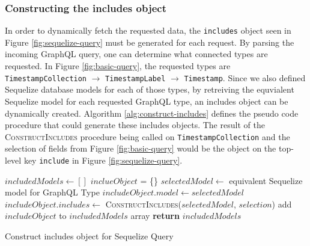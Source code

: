 \subsubsection{Constructing the includes object}
In order to dynamically fetch the requested data, the \verb!includes! object seen in Figure \ref{fig:sequelize-query} must be generated for each request.  By parsing the incoming GraphQL query, one can determine what connected types are requested.  In Figure \ref{fig:basic-query}, the requested types are \verb!TimestampCollection! $\rightarrow$ \verb!TimestampLabel! $\rightarrow$ \Verb!Timestamp!.  Since we also defined Sequelize database models for each of those types, by retreiving the equvialent Sequelize model for each requested GraphQL type, an includes object can be dynamically created. Algorithm \ref{alg:construct-includes} defines the pseudo code procedure that could generate these includes objects.  The result of the \textsc{ConstructIncludes} procedure being called on \Verb!TimestampCollection! and the selection of fields from Figure \ref{fig:basic-query} would be the object on the top-level key \verb!include! in Figure \ref{fig:sequelize-query}.

\begin{algorithm}[H]
    \begin{algorithmic}
            \State $includedModels \leftarrow []$
                \State $inclueObject$ = \{\}
                    \State $selectedModel \leftarrow$ equivalent Sequelize model for GraphQL Type
                    \State $includeObject.model \leftarrow selectedModel$
                    \State $includeObject.includes \leftarrow$ 
                    \State \textsc{  ConstructIncludes}($selectedModel$, $selection$)
                    \State add $includeObject$ to $includedModels$ array
                \EndIf
            \EndFor
            \State \textbf{return} $includedModels$
        \EndProcedure
    \end{algorithmic}
    \caption{Construct includes object for Sequelize Query}
    \label{alg:construct-includes}
\end{algorithm}